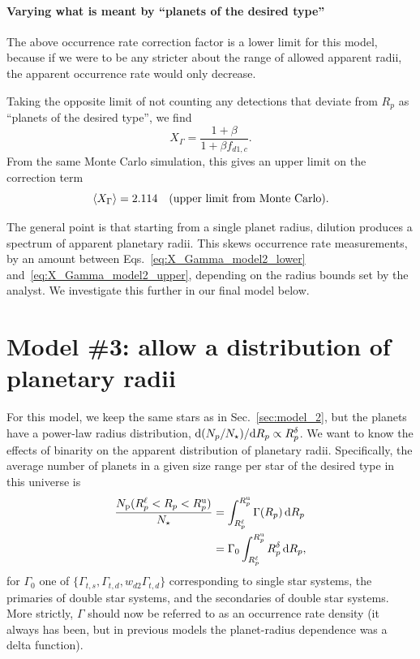 \documentclass{emulateapj}
\begin{document}

\paragraph{Varying what is meant by ``planets of the desired type'' }
The above occurrence rate correction factor is a lower limit for this model, 
because if we were to be any stricter about the range of allowed apparent 
radii, the apparent occurrence rate would only decrease.

Taking the opposite limit of not counting any detections that deviate 
from $R_p$ as ``planets of the desired type'',
we find
\begin{equation}
X_{\Gamma} = \frac{1 + \beta }{1 + \beta f_{d1,c}}.
\end{equation}
From the same Monte Carlo simulation, this gives an upper limit on the 
correction term
\begin{equation}
\langle X_\Gamma \rangle = 2.114\quad ({\rm upper\ limit\ from\ Monte\ 
Carlo}).
\label{eq:X_Gamma_model2_upper}
\end{equation}

The general point is that starting from a single planet radius, dilution 
produces a spectrum of apparent planetary radii. 
This skews occurrence rate measurements, by an amount between 
Eqs.~\ref{eq:X_Gamma_model2_lower} and~\ref{eq:X_Gamma_model2_upper},
depending on the radius bounds set by the analyst.
We investigate this further in our final model below.


\section{Model \#3: allow a distribution of planetary radii}
\label{sec:model_3}

For this model, we keep the same stars as in Sec.~\ref{sec:model_2}, but the 
planets have a power-law radius distribution, ${\rm 
d}(N_p/N_\star)/{\rm 
d}R_p\propto R_p^\delta$. 
We want to know the effects of binarity on the apparent distribution of 
planetary radii.
Specifically, the average number of planets in a given size range per star of 
the desired type in this universe is
\begin{align}
\frac{N_{\rm p}(R_p^{\rm \ell}<R_p <R_p^{\rm u})}{N_{\rm \star}} 
&= 
\int_{R_p^{\rm \ell}}^{R_p^{\rm u}} \Gamma(R_p) \,{\rm d}R_p
\\
&=
\Gamma_0 \int_{R_p^{\rm \ell}}^{R_p^{\rm u}} R_p^\delta \,{\rm d}R_p,
\end{align}
for $\Gamma_0$ one of $\{\Gamma_{t,s}, \Gamma_{t,d}, w_{d2}\Gamma_{t,d}\}$
corresponding to single star systems, the primaries of double star systems, 
and the secondaries of double star systems.
More strictly, $\Gamma$ should now be referred to as an occurrence rate 
density (it always has been, but in previous models the planet-radius 
dependence was a delta function).
\end{document}
